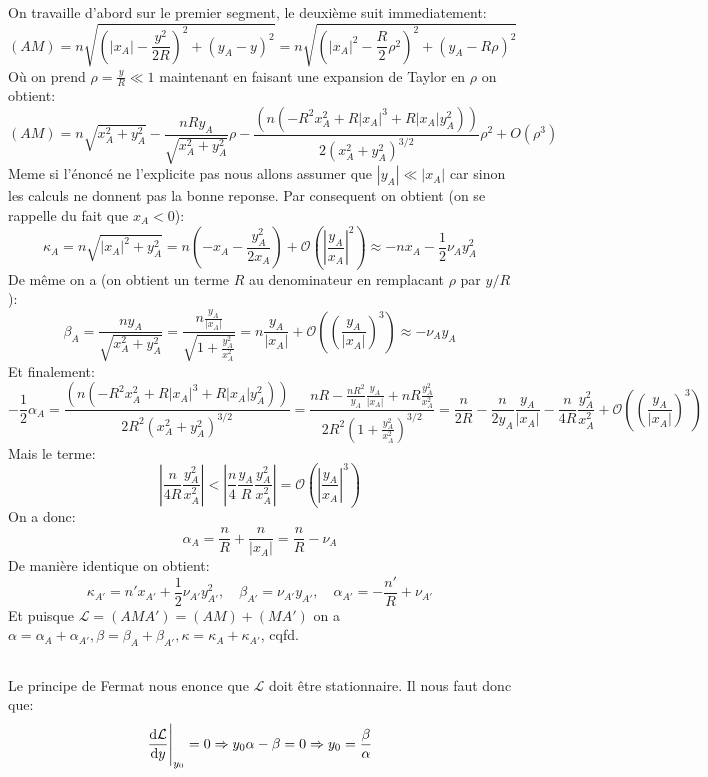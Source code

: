 \documentclass[10pt,a4paper]{article}
\begin{document}
\subsection{}
On travaille d'abord sur le premier segment, le deuxième suit immediatement:
\[
(AM) = n \sqrt{(|x_A| - \frac{y^2}{2R})^2 + (y_A - y)^2} = n \sqrt{(|x_A|^2 - \frac{R}{2} \rho^2)^2 + (y_A - R \rho)^2}
\]
Où on prend $\rho = \frac{y}{R} \ll 1$ maintenant en faisant une expansion de Taylor en $\rho$ on obtient:
\[
(AM) = n \sqrt{x_A^2+y_A^2}-\frac{n  R
   y_A}{\sqrt{x_A^2+y_A^2}}\rho-\frac{\left(n \left(-R^2 x_A^2+R
   |x_A|^3+R |x_A| y_A^2\right)\right)}{2
   \left(x_A^2+y_A^2\right)^{3/2}} \rho^2 +O\left(\rho ^3\right)
\]
Meme si l'énoncé ne l'explicite pas nous allons assumer que $|y_A| \ll |x_A|$ car sinon les calculs ne donnent pas la bonne reponse. Par consequent on obtient (on se rappelle du fait que $x_A < 0$):
\[
\kappa_A = n \sqrt{|x_A|^2 + y_A^2} = n\left(-x_A - \frac{y_A^2}{2 x_A}\right) + \mathcal{O}\left(\left|\frac{y_A}{x_A}\right|^2\right) \approx -n x_A - \frac{1}{2} \nu_A y_A^2 
\]
De même on a (on obtient un terme $R$ au denominateur en remplacant $\rho$ par $y/R$):
\[
\beta_A = \frac{n y_A}{\sqrt{x_A^2 + y_A^2}} = \frac{n \frac{y_A}{|x_A|}}{\sqrt{1 + \frac{y_A^2}{x_A^2}}} = n\frac{y_A}{|x_A|} + \mathcal{O}\left(\left(\frac{y_A}{|x_A|}\right)^3\right) \approx -  \nu_A y_A
\]
Et finalement:
\[
-\frac{1}{2}\alpha_A = \frac{\left(n \left(-R^2 x_A^2+R
   |x_A|^3+R |x_A| y_A^2\right)\right)}{2 R^2
   \left(x_A^2+y_A^2\right)^{3/2}} = \frac{nR - \frac{n R^2}{y_A} \frac{y_A}{|x_A|} + nR \frac{y_A^2}{x_A^2}}{2 R^2(1 + \frac{y_A^2}{x_A^2})^{3/2}} = \frac{n}{2R} - \frac{n}{2 y_A} \frac{y_A}{|x_A|} - \frac{n}{4 R}  \frac{y_A^2}{x_A^2} + \mathcal{O}\left(\left(\frac{y_A}{|x_A|}\right)^3\right)
\]
Mais le terme:
\[
\left|\frac{n}{4 R}\frac{y_A^2}{x_A^2}\right| < \left|\frac{n}{4} \frac{y_A}{R} \frac{y_A^2}{x_A^2}\right| = \mathcal{O}\left(\left| \frac{y_A}{x_A}\right|^3\right)
\]
On a donc:
\[
\alpha_A = \frac{n}{R} +\frac{n}{|x_A|} = \frac{n}{R} - \nu_A
\]
De manière identique on obtient:
\[
\kappa_{A'} = n' x_{A'} + \frac{1}{2}\nu_{A'} y_{A'}^2, \quad \beta_{A'} = \nu_{A'} y_{A'}, \quad \alpha_{A'} = -\frac{n'}{R} + \nu_{A'}
\]
Et puisque $\mathcal{L} = (AMA') = (AM) + (MA')$ on a $\alpha = \alpha_{A} + \alpha_{A'}, \beta = \beta_A + \beta_{A'}, \kappa = \kappa_A + \kappa_{A'}$, cqfd.

\subsection{}
Le principe de Fermat nous enonce que $\mathcal{L}$ doit être stationnaire. Il nous faut donc que:
\[
\dv{\mathcal{L}}{y}\Bigg|_{y_0} = 0 \Rightarrow  y_0 \alpha - \beta = 0 \Rightarrow y_0 = \frac{\beta}{\alpha} 
\]
\end{document}
